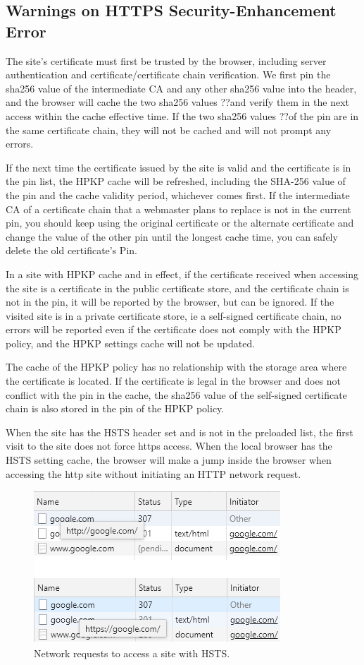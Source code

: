 \subsection{Warnings on HTTPS Security-Enhancement Error}

The site's certificate must first be trusted by the browser, including server authentication and certificate/certificate chain verification. We first pin the sha256 value of the intermediate CA and any other sha256 value into the header, and the browser will cache the two sha256 values ??and verify them in the next access within the cache effective time. If the two sha256 values ??of the pin are in the same certificate chain, they will not be cached and will not prompt any errors.

If the next time the certificate issued by the site is valid and the certificate is in the pin list, the HPKP cache will be refreshed, including the SHA-256 value of the pin and the cache validity period, whichever comes first. If the intermediate CA of a certificate chain that a webmaster plans to replace is not in the current pin, you should keep using the original certificate or the alternate certificate and change the value of the other pin until the longest cache time, you can safely delete the old certificate's Pin.

In a site with HPKP cache and in effect, if the certificate received when accessing the site is a certificate in the public certificate store, and the certificate chain is not in the pin, it will be reported by the browser, but can be ignored. If the visited site is in a private certificate store, ie a self-signed certificate chain, no errors will be reported even if the certificate does not comply with the HPKP policy, and the HPKP settings cache will not be updated.

The cache of the HPKP policy has no relationship with the storage area where the certificate is located. If the certificate is legal in the browser and does not conflict with the pin in the cache, the sha256 value of the self-signed certificate chain is also stored in the pin of the HPKP policy.

When the site has the HSTS header set and is not in the preloaded list, the first visit to the site does not force https access. When the local browser has the HSTS setting cache, the browser will make a jump inside the browser when accessing the http site without initiating an HTTP network request.

\begin{figure}[htbp]
\centerline{\includegraphics{Figure/fig5.png}}
\caption{Network requests to access a site with HSTS.}
\label{fig}
\end{figure}

